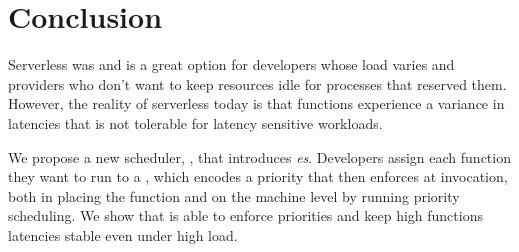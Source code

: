\section{Conclusion}


Serverless was and is a great option for developers whose load varies and
providers who don't want to keep resources idle for processes that reserved
them. However, the reality of serverless today is that functions experience a
variance in latencies that is not tolerable for latency sensitive workloads. 

We propose a new scheduler, \sys{}, that introduces \emph{\priceclass{}es}.
Developers assign each function they want to run to a \priceclass{}, which
encodes a priority that \sys{} then enforces at invocation, both in placing the
function and on the machine level by running priority scheduling. We show that
\sys{} is able to enforce priorities and keep high \class{} functions latencies
stable even under high load.